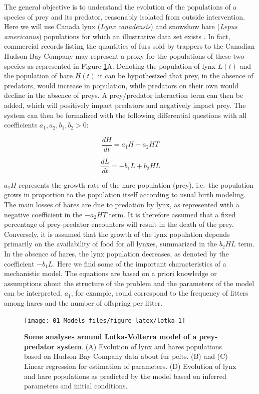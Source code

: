 \documentclass[a4paper,12pt,twoside,onecolumn,openright,final,oldfontcommands]{memoir}
\begin{document}
The general objective is to understand the evolution of the populations
of a species of prey and its predator, reasonably isolated from outside
intervention. Here we will use Canada lynx (\emph{Lynx canadensis}) and
snowshow hare (\emph{Lepus americanus}) populations for which an
illustrative data set exists \citep{hewitt1917conservation}. In fact,
commercial records listing the quantities of furs sold by trappers to
the Canadian Hudson Bay Company may represent a proxy for the
populations of these two species as represented in Figure
\ref{fig:lotka}A. Denoting the population of lynx \(L(t)\) and the
population of hare \(H(t)\) it can be hypothesized that prey, in the
absence of predators, would increase in population, while predators on
their own would decline in the absence of preys. A prey/predator
interaction term can then be added, which will positively impact
predators and negatively impact prey. The system can then be formalized
with the following differential questions with all coefficients
\(a_1, a_2, b_1, b_2 >0\):

\[\dfrac{dH}{dt}=a_1H-a_2HT\]

\[\dfrac{dL}{dt}=-b_1L+b_2HL\]

\(a_1H\) represents the growth rate of the hare population (prey),
i.e.~the population grows in proportion to the population itself
according to usual birth modeling. The main losses of hares are due to
predation by lynx, as represented with a negative coefficient in the
\(-a_2HT\) term. It is therefore assumed that a fixed percentage of
prey-predator encounters will result in the death of the prey.
Conversely, it is assumed that the growth of the lynx population depends
primarily on the availability of food for all lynxes, summarized in the
\(b_2HL\) term. In the absence of hares, the lynx population decreases,
as denoted by the coefficient \(-b_1L\). Here we find some of the
important characteristics of a mechanistic model. The equations are
based on a priori knowledge or assumptions about the structure of the
problem and the parameters of the model can be interpreted. \(a_1\), for
example, could correspond to the frequency of litters among hares and
the number of offspring per litter.

\begin{figure}

{\centering \texttt{[image: 01-Models\_files/figure-latex/lotka-1]} 

}

\caption[Some analyses around Lotka-Volterra model of a prey-predator system]{\textbf{Some analyses around Lotka-Volterra model of
a prey-predator system}. (A) Evolution of lynx and hares populations
based on Hudson Bay Company data about fur pelts. (B) and (C) Linear
regression for estimation of parameters. (D) Evolution of lynx and hare
populations as predicted by the model based on inferred parameters and
initial conditions.}\label{fig:lotka}
\end{figure}
\end{document}
